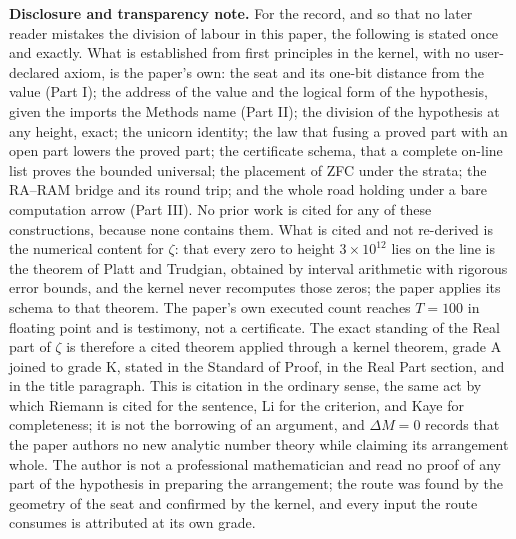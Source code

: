 \documentclass[10pt]{article}
\begin{document}
\textbf{Disclosure and transparency note.} For the record, and so that
no later reader mistakes the division of labour in this paper, the
following is stated once and exactly. What is established from first
principles in the kernel, with no user-declared axiom, is the paper's
own: the seat and its one-bit distance from the value (Part I); the
address of the value and the logical form of the hypothesis, given the
imports the Methods name (Part II); the division of the hypothesis at
any height, exact; the unicorn identity; the law that fusing a proved
part with an open part lowers the proved part; the certificate schema,
that a complete on-line list proves the bounded universal; the placement
of ZFC under the strata; the RA--RAM bridge and its round trip; and the
whole road holding under a bare computation arrow (Part III). No prior
work is cited for any of these constructions, because none contains
them. What is cited and not re-derived is the numerical content for
\(\zeta\): that every zero to height \(3 \times 10^{12}\) lies on the
line is the theorem of Platt and Trudgian, obtained by interval
arithmetic with rigorous error bounds, and the kernel never recomputes
those zeros; the paper applies its schema to that theorem. The paper's
own executed count reaches \(T = 100\) in floating point and is
testimony, not a certificate. The exact standing of the Real part of
\(\zeta\) is therefore a cited theorem applied through a kernel theorem,
grade A joined to grade K, stated in the Standard of Proof, in the Real
Part section, and in the title paragraph. This is citation in the
ordinary sense, the same act by which Riemann is cited for the sentence,
Li for the criterion, and Kaye for completeness; it is not the borrowing
of an argument, and \(\Delta M = 0\) records that the paper authors no
new analytic number theory while claiming its arrangement whole. The
author is not a professional mathematician and read no proof of any part
of the hypothesis in preparing the arrangement; the route was found by
the geometry of the seat and confirmed by the kernel, and every input
the route consumes is attributed at its own grade.
\end{document}
